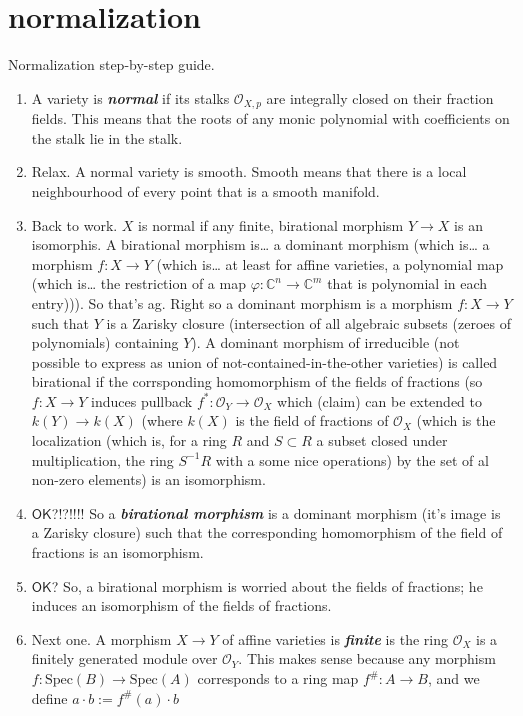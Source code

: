 \section{normalization}

Normalization step-by-step guide.
\begin{enumerate}
\item A variety is \textit{\textbf{normal}} if its stalks  \(\mathcal{O}_{X,p}\) are integrally closed on their fraction fields. This means that the roots of any monic polynomial with coefficients on the stalk lie in the stalk.
\item Relax. A normal variety is smooth. Smooth means that there is a local neighbourhood of every point that is a smooth manifold.
\item Back to work. \(X\) is normal if any finite, birational morphism \(Y \to X\) is an isomorphis. A birational morphism is… a dominant morphism (which is… a morphism \(f:X \to Y\) (which is… at least for affine varieties, a polynomial map (which is… the restriction of a map \(\varphi:\mathbb{C}^n \to \mathbb{C}^m\) that is polynomial in each entry))). So that's ag. Right so a dominant morphism is a morphism \(f:X \to Y\) such that \(Y\) is a Zarisky closure (intersection of all algebraic subsets (zeroes of polynomials) containing \(Y\)). A dominant morphism of irreducible (not possible to express as union of not-contained-in-the-other varieties) is called birational if the corrsponding homomorphism of the fields of fractions (so \(f:X \to Y\) induces pullback \(f^*:\mathcal{O}_Y \to \mathcal{O}_X\) which (claim) can be extended to \(k(Y)\to k(X)\) (where \(k(X)\) is the field of fractions of \(\mathcal{O}_X\) (which is the localization (which is, for a ring \(R\) and \(S \subset R\) a subset closed under multiplication, the ring \(S^{-1}R\) with a some nice operations) by the set of al non-zero elements) is an isomorphism.
\item \(\mathsf{OK}\)?!?!!!! So a \textit{\textbf{birational morphism}} is a dominant morphism (it's image is a Zarisky closure) such that the corresponding homomorphism of the field of fractions is an isomorphism.
\item \(\mathsf{OK}\)? So, a birational morphism is worried about the fields of fractions; he induces an isomorphism of the fields of fractions.
\item Next one. A morphism \(X \to Y\) of affine varieties is \textit{\textbf{finite}} is the ring \(\mathcal{O}_X\) is a finitely generated module over \(\mathcal{O}_Y\). This makes sense because any morphism \( f: \mathrm{Spec}(B) \to \mathrm{Spec}(A) \) corresponds to a ring map \( f^\#: A \to B \), and we define \(a \cdot b := f^\#(a) \cdot b\)

\end{enumerate}

